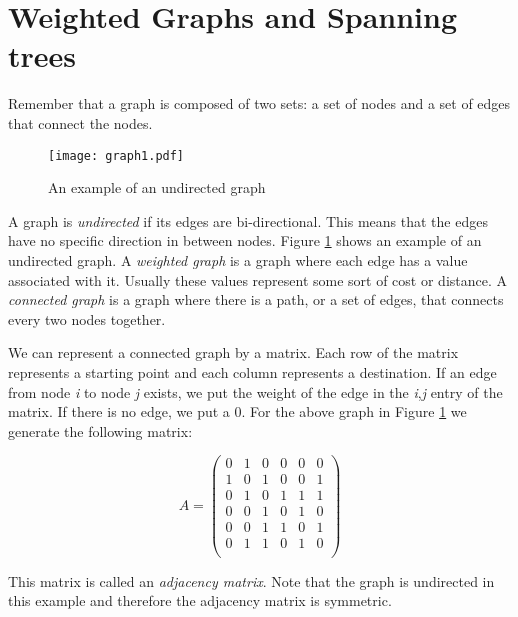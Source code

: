 \label{Ch:Kruskal}


\section*{Weighted Graphs and Spanning trees}

Remember that a graph is composed of two sets: a set of nodes and a set of edges that connect the nodes.

\begin{figure}[H]
\texttt{[image: graph1.pdf]}
\caption{An example of an undirected graph}
\label{mst:graph1}
\end{figure}

A graph is \emph{undirected} if its edges are bi-directional. This means that the edges have no specific direction in between nodes. Figure
\ref{mst:graph1} shows an example of an undirected graph.
A \emph{weighted graph} is a graph where each edge has a value associated with it.
Usually these values represent some sort of cost or distance.
A \emph{connected graph} is a graph where there is a path, or a set of edges, that connects every two nodes together.

We can represent a connected graph by a matrix.
Each row of the matrix represents a starting point and each column represents a destination.
If an edge from node \emph{i} to node \emph{j} exists, we put the weight of the edge in the \emph{i},\emph{j} entry of the matrix.
If there is no edge, we put a 0.
For the above graph in Figure \ref{mst:graph1} we generate the following matrix:

\[
A = \begin{pmatrix}
0 & 1 & 0 & 0 & 0 & 0\\
1 & 0 & 1 & 0 & 0 & 1\\
0 & 1 & 0 & 1 & 1 & 1\\
0 & 0 & 1 & 0 & 1 & 0\\
0 & 0 & 1 & 1 & 0 & 1\\
0 & 1 & 1 & 0 & 1 & 0\\
\end{pmatrix}
\]

This matrix is called an \emph{adjacency matrix}.
Note that the graph is undirected in this example and therefore the adjacency matrix is symmetric.


